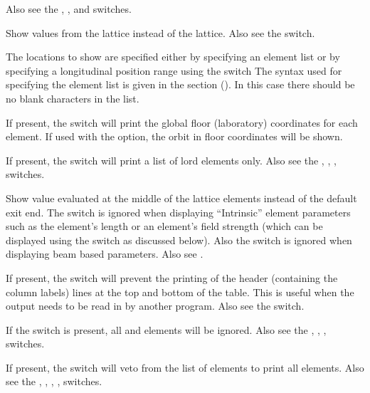 {{{{{{{{\begin{description}
Also see the , , and  switches.
%
\item[-design] \Newline
Show values from the  lattice instead of the  lattice. Also see the 
switch.
%
\item[<element_list>] \Newline
The locations to show are specified either by specifying an element list or by specifying a
longitudinal position range using the  switch The syntax used for specifying the element list
is given in the  section (). In this case
there should be no blank characters in the list.
%
\item[-floor_coords] \Newline
If present, the  switch will print the global floor (laboratory) coordinates for
each element. If used with the  option, the orbit in floor coordinates will be shown.
%
\item[-lords] \Newline
If present, the  switch will print a list of lord elements only. Also see the
, , ,  switches.
%
\item[-middle] \Newline
Show value evaluated at the middle of the lattice elements instead of the default exit end.
The  switch is ignored when displaying ``Intrinsic'' element
parameters such as the element's length or an element's field strength (which can be displayed using
the  switch as discussed below). Also the  switch is ignored when
displaying beam based parameters. Also see .
%
\item[-no_label_lines] \Newline
If present, the  switch will prevent the printing of the header (containing the
column labels) lines at the top and bottom of the table.  This is useful when the output needs to be
read in by another program. Also see the  switch.
%
\item[-no_slaves] \Newline
If the  switch is present, all  and  elements
will be ignored. Also see the , , , 
switches.
%
\item[-no_super_slaves] \Newline
If present, the  switch will veto from the list of elements to print all
 elements. Also see the , , , ,
 switches.
%
\item[-no_tail_lines] \Newline

\end{description}}}}}}}}}
